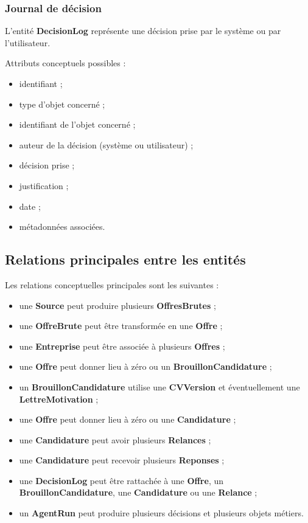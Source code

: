 \documentclass[11pt,a4paper]{article}
\begin{document}
\subsubsection{Journal de décision}

L’entité \textbf{DecisionLog} représente une décision prise par le système ou par l’utilisateur.

Attributs conceptuels possibles :
\begin{itemize}
    \item identifiant ;
    \item type d’objet concerné ;
    \item identifiant de l’objet concerné ;
    \item auteur de la décision (système ou utilisateur) ;
    \item décision prise ;
    \item justification ;
    \item date ;
    \item métadonnées associées.
\end{itemize}

\subsection{Relations principales entre les entités}

Les relations conceptuelles principales sont les suivantes :

\begin{itemize}
    \item une \textbf{Source} peut produire plusieurs \textbf{OffresBrutes} ;
    \item une \textbf{OffreBrute} peut être transformée en une \textbf{Offre} ;
    \item une \textbf{Entreprise} peut être associée à plusieurs \textbf{Offres} ;
    \item une \textbf{Offre} peut donner lieu à zéro ou un \textbf{BrouillonCandidature} ;
    \item un \textbf{BrouillonCandidature} utilise une \textbf{CVVersion} et éventuellement une \textbf{LettreMotivation} ;
    \item une \textbf{Offre} peut donner lieu à zéro ou une \textbf{Candidature} ;
    \item une \textbf{Candidature} peut avoir plusieurs \textbf{Relances} ;
    \item une \textbf{Candidature} peut recevoir plusieurs \textbf{Reponses} ;
    \item une \textbf{DecisionLog} peut être rattachée à une \textbf{Offre}, un \textbf{BrouillonCandidature}, une \textbf{Candidature} ou une \textbf{Relance} ;
    \item un \textbf{AgentRun} peut produire plusieurs décisions et plusieurs objets métiers.
\end{itemize}
\end{document}
